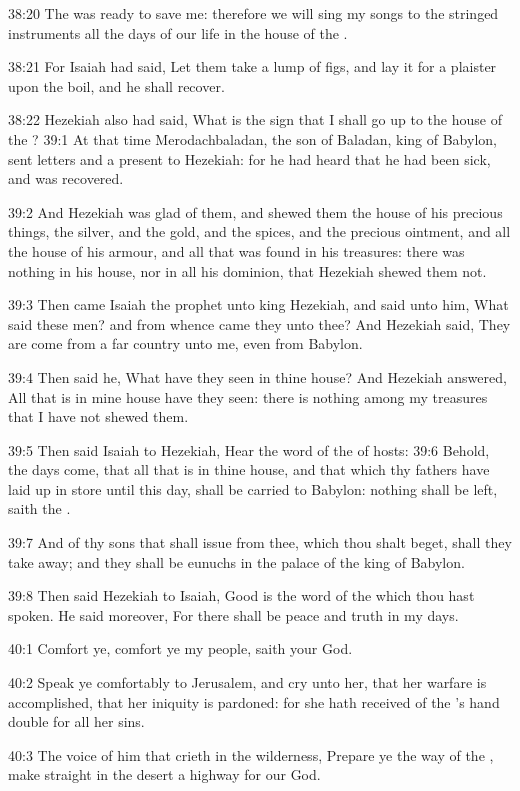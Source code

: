 38:20 The \LORD was ready to save me: therefore we will sing my songs
to the stringed instruments all the days of our life in the house of
the \LORD.

38:21 For Isaiah had said, Let them take a lump of figs, and lay it
for a plaister upon the boil, and he shall recover.

38:22 Hezekiah also had said, What is the sign that I shall go up to
the house of the \LORD?  39:1 At that time Merodachbaladan, the son of
Baladan, king of Babylon, sent letters and a present to Hezekiah: for
he had heard that he had been sick, and was recovered.

39:2 And Hezekiah was glad of them, and shewed them the house of his
precious things, the silver, and the gold, and the spices, and the
precious ointment, and all the house of his armour, and all that was
found in his treasures: there was nothing in his house, nor in all his
dominion, that Hezekiah shewed them not.

39:3 Then came Isaiah the prophet unto king Hezekiah, and said unto
him, What said these men? and from whence came they unto thee? And
Hezekiah said, They are come from a far country unto me, even from
Babylon.

39:4 Then said he, What have they seen in thine house? And Hezekiah
answered, All that is in mine house have they seen: there is nothing
among my treasures that I have not shewed them.

39:5 Then said Isaiah to Hezekiah, Hear the word of the \LORD of hosts:
39:6 Behold, the days come, that all that is in thine house, and that
which thy fathers have laid up in store until this day, shall be
carried to Babylon: nothing shall be left, saith the \LORD.

39:7 And of thy sons that shall issue from thee, which thou shalt
beget, shall they take away; and they shall be eunuchs in the palace
of the king of Babylon.

39:8 Then said Hezekiah to Isaiah, Good is the word of the \LORD which
thou hast spoken. He said moreover, For there shall be peace and truth
in my days.

40:1 Comfort ye, comfort ye my people, saith your God.

40:2 Speak ye comfortably to Jerusalem, and cry unto her, that her
warfare is accomplished, that her iniquity is pardoned: for she hath
received of the \LORD's hand double for all her sins.

40:3 The voice of him that crieth in the wilderness, Prepare ye the
way of the \LORD, make straight in the desert a highway for our God.

